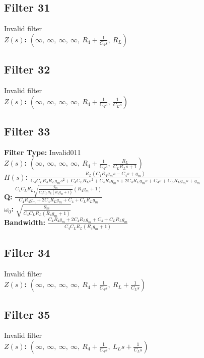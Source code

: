 \documentclass{article}
\begin{document}
\subsection*{Filter 31}
Invalid filter \\ 
\textbf{$Z(s)$:} $\left( \infty, \  \infty, \  \infty, \  \infty, \  R_{4} + \frac{1}{C_{4} s}, \  R_{L}\right)$ \\ 
\subsection*{Filter 32}
Invalid filter \\ 
\textbf{$Z(s)$:} $\left( \infty, \  \infty, \  \infty, \  \infty, \  R_{4} + \frac{1}{C_{4} s}, \  \frac{1}{C_{L} s}\right)$ \\ 
\subsection*{Filter 33}
\textbf{Filter Type:} Invalid011 \\ 
\textbf{$Z(s)$:} $\left( \infty, \  \infty, \  \infty, \  \infty, \  R_{4} + \frac{1}{C_{4} s}, \  \frac{R_{L}}{C_{L} R_{L} s + 1}\right)$ \\ 
\textbf{$H(s)$:} $\frac{R_{L} \left(C_{4} R_{4} g_{m} s - C_{4} s + g_{m}\right)}{C_{4} C_{L} R_{4} R_{L} g_{m} s^{2} + C_{4} C_{L} R_{L} s^{2} + C_{4} R_{4} g_{m} s + 2 C_{4} R_{L} g_{m} s + C_{4} s + C_{L} R_{L} g_{m} s + g_{m}}$ \\ 
\textbf{Q:} $\frac{C_{4} C_{L} R_{L} \sqrt{\frac{g_{m}}{C_{4} C_{L} R_{L} \left(R_{4} g_{m} + 1\right)}} \left(R_{4} g_{m} + 1\right)}{C_{4} R_{4} g_{m} + 2 C_{4} R_{L} g_{m} + C_{4} + C_{L} R_{L} g_{m}}$ \\ 
\textbf{$\omega_0$:} $\sqrt{\frac{g_{m}}{C_{4} C_{L} R_{L} \left(R_{4} g_{m} + 1\right)}}$ \\ 
\textbf{Bandwidth:} $\frac{C_{4} R_{4} g_{m} + 2 C_{4} R_{L} g_{m} + C_{4} + C_{L} R_{L} g_{m}}{C_{4} C_{L} R_{L} \left(R_{4} g_{m} + 1\right)}$ \\ 
\subsection*{Filter 34}
Invalid filter \\ 
\textbf{$Z(s)$:} $\left( \infty, \  \infty, \  \infty, \  \infty, \  R_{4} + \frac{1}{C_{4} s}, \  R_{L} + \frac{1}{C_{L} s}\right)$ \\ 
\subsection*{Filter 35}
Invalid filter \\ 
\textbf{$Z(s)$:} $\left( \infty, \  \infty, \  \infty, \  \infty, \  R_{4} + \frac{1}{C_{4} s}, \  L_{L} s + \frac{1}{C_{L} s}\right)$ \\ 
\end{document}
